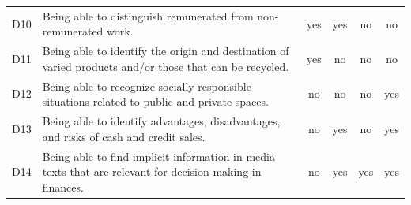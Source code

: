 \documentclass[
	article,			%
	12pt,				%
	oneside,			%
	a4paper,			%
	]{article}
\begin{document}
\begin{table}[h!]
\begin{tabular}{lp{30.93em}cccc}
    D10   & Being able to distinguish remunerated from non-remunerated work. & yes   & yes   & no    & no \\
    D11   & Being able to identify the origin and destination of varied products and/or those that can be recycled. & yes   & no    & no    & no \\
    D12   & Being able to recognize socially responsible situations related to public and private spaces. & no    & no    & no    & yes \\
    D13   & Being able to identify advantages, disadvantages, and risks of cash and credit sales. & no    & yes   & no    & yes \\
    D14   & Being able to find implicit information in media texts that are relevant for decision-making in finances.  & no    & yes   & yes   & yes \\
    \hline
    \hline
    \end{tabular}%
  \label{tab:descriptors}%
\end{table}%
\end{document}
